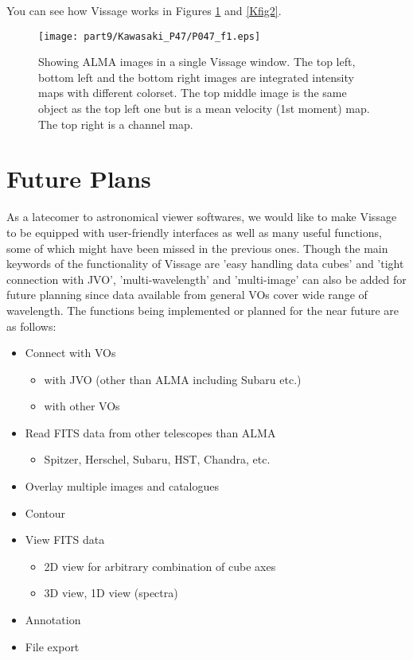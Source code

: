 You can see how Vissage works in Figures \ref{Kfig1} and \ref{Kfig2}. 

\begin{figure}[tb]
  \centering
  \texttt{[image: part9/Kawasaki\_P47/P047\_f1.eps]}
  \caption{Showing ALMA images in a single Vissage window. The top left, bottom left and the bottom right images are integrated intensity maps with different colorset. The top middle image is the same object as the top left one but is a mean velocity (1st moment) map. The top right is a channel map.}
  \label{Kfig1}
\end{figure}

\section{Future Plans}
As a latecomer to astronomical viewer softwares, we would like to make Vissage 
to be equipped with user-friendly interfaces as well as many useful functions, 
some of which might have been missed in the previous ones. 
Though the main keywords of the functionality of Vissage are 'easy handling 
data cubes' and 'tight connection with JVO', 'multi-wavelength' and 
'multi-image' can also be added for future planning since data available from 
general VOs cover wide range of wavelength. 
The functions being implemented or planned for the near future are as follows: 

\begin{itemize}
  \item Connect with VOs
    \begin{itemize}
      \item with JVO (other than ALMA including Subaru etc.)
      \item with other VOs
    \end{itemize}
  \item Read FITS data from other telescopes than ALMA
    \begin{itemize}
      \item Spitzer, Herschel, Subaru, HST, Chandra, etc.
    \end{itemize}
  \item Overlay multiple images and catalogues
  \item Contour
  \item View FITS data
    \begin{itemize}
      \item 2D view for arbitrary combination of cube axes
      \item 3D view, 1D view (spectra)
    \end{itemize}
  \item Annotation
  \item File export
\end{itemize}

